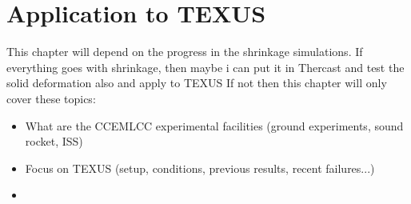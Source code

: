 \chapter{Application to TEXUS}
\begin{nolinkcolors} 
\minitoc
\end{nolinkcolors}
\newpage

This chapter will depend on the progress in the shrinkage simulations.
If everything goes with shrinkage, then maybe i can put it in Thercast and test the solid deformation also and apply to TEXUS
If not then this chapter will only cover these topics:
\begin{itemize}
\item What are the CCEMLCC experimental facilities (ground experiments, sound rocket, ISS)
\item Focus on TEXUS (setup, conditions, previous results, recent failures...)
\item 

\end{itemize}